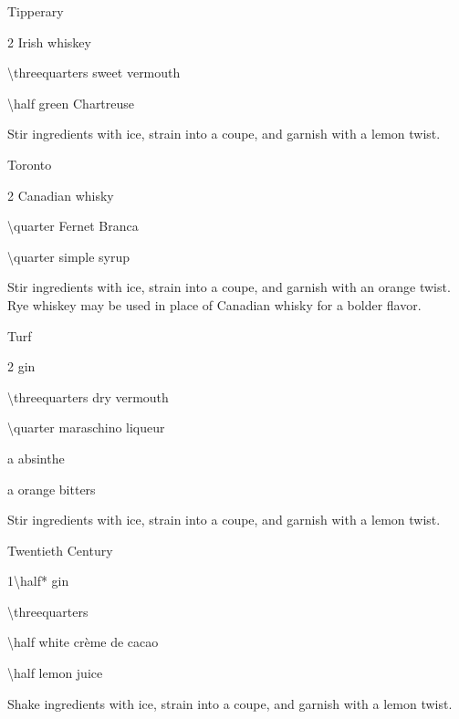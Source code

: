 \begin{Cocktail}{Tipperary}
	\begin{Ingredients}
	\item \SI{2}{\oz} Irish whiskey
	\item \SI{\threequarters}{\oz} sweet vermouth
	\item \SI{\half}{\oz} green Chartreuse
	\end{Ingredients}
	
	\begin{Instructions}
	Stir ingredients with ice, strain into a coupe, and garnish with a lemon twist.
	\end{Instructions}
\end{Cocktail}

\begin{Cocktail}{Toronto}
	\begin{Ingredients}
	\item \SI{2}{\oz} Canadian whisky
	\item \SI{\quarter}{\oz} Fernet Branca
	\item \SI{\quarter}{\oz} simple syrup
	\end{Ingredients}
	
	\begin{Instructions}
	Stir ingredients with ice, strain into a coupe, and garnish with an orange twist.  Rye whiskey may be used in place of Canadian whisky for a bolder flavor.
	\end{Instructions}
\end{Cocktail}

\begin{Cocktail}{Turf}
	\begin{Ingredients}
	\item \SI{2}{\oz} gin
	\item \SI{\threequarters}{\oz} dry vermouth
	\item \SI{\quarter}{\oz} maraschino liqueur
	\item a \si{\dash} absinthe
	\item a \si{\dash} orange bitters
	\end{Ingredients}
	
	\begin{Instructions}
	Stir ingredients with ice, strain into a coupe, and garnish with a lemon twist.
	\end{Instructions}
\end{Cocktail}

\begin{Cocktail}{Twentieth Century}
	\begin{Ingredients}
	\item \SI{1\half*}{\oz} gin
	\item \SI{\threequarters}{\oz} \Lillet
	\item \SI{\half}{\oz} white cr\`eme de cacao
	\item \SI{\half}{\oz} lemon juice
	\end{Ingredients}
	
	\begin{Instructions}
	Shake ingredients with ice, strain into a coupe, and garnish with a lemon twist.
	\end{Instructions}
\end{Cocktail}